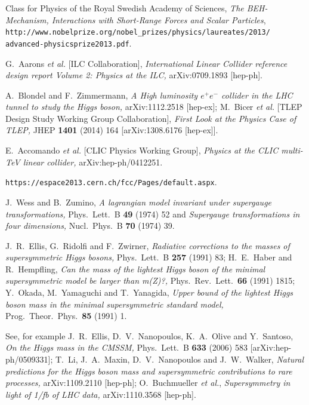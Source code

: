 \documentclass[12pt]{article}
\numberwithin{equation}{section}
\begin{document}
\begin{thebibliography}{99}
Class for Physics of the Royal Swedish Academy of Sciences,
{\it The BEH-Mechanism, Interactions with Short-Range Forces and Scalar Particles}, \\
{\tt http://www.nobelprize.org/nobel\_prizes/physics/laureates/2013/}\\ {\tt advanced-physicsprize2013.pdf}.

G.~Aarons {\it et al.}  [ILC Collaboration],
{\it International Linear Collider reference design report Volume 2: Physics at the ILC,}
  arXiv:0709.1893 [hep-ph].
  
A.~Blondel and F.~Zimmermann,
{\it A High luminosity $e^+e^-$ collider in the LHC tunnel to study the Higgs boson,}
  arXiv:1112.2518 [hep-ex];
M.~Bicer {\it et al.}  [TLEP Design Study Working Group Collaboration],
{\it First Look at the Physics Case of TLEP,}
  JHEP {\bf 1401} (2014) 164
  [arXiv:1308.6176 [hep-ex]].

E.~Accomando {\it et al.}  [CLIC Physics Working Group],
{\it Physics at the CLIC multi-TeV linear collider,}
  arXiv:hep-ph/0412251.

{\tt https://espace2013.cern.ch/fcc/Pages/default.aspx}.

J.~Wess and B.~Zumino,
{\it A lagrangian model invariant under supergauge transformations,}
  Phys.\ Lett.\  B {\bf 49} (1974) 52 and
{\it Supergauge transformations in four dimensions,}
  Nucl.\ Phys.\  B {\bf 70} (1974) 39.
  
J.~R.~Ellis, G.~Ridolfi and F.~Zwirner,
{\it Radiative corrections to the masses of supersymmetric Higgs bosons,}
  Phys.\ Lett.\  B {\bf 257} (1991) 83;
H.~E.~Haber and R.~Hempfling,
{\it Can the mass of the lightest Higgs boson of the minimal supersymmetric
  model be larger than m(Z)?,}
  Phys.\ Rev.\ Lett.\  {\bf 66} (1991) 1815;
Y.~Okada, M.~Yamaguchi and T.~Yanagida,
{\it Upper bound of the lightest Higgs boson mass in the minimal supersymmetric
  standard model,}
  Prog.\ Theor.\ Phys.\  {\bf 85} (1991) 1.
  
See, for example
J.~R.~Ellis, D.~V.~Nanopoulos, K.~A.~Olive and Y.~Santoso,
{\it On the Higgs mass in the CMSSM,}
  Phys.\ Lett.\  B {\bf 633} (2006) 583
  [arXiv:hep-ph/0509331];
T.~Li, J.~A.~Maxin, D.~V.~Nanopoulos and J.~W.~Walker,
{\it Natural predictions for the Higgs boson mass and supersymmetric contributions to rare processes,}
  arXiv:1109.2110 [hep-ph];
O.~Buchmueller {\it et al.},
{\it Supersymmetry in light of 1/fb of LHC data,}
  arXiv:1110.3568 [hep-ph].


\end{thebibliography}
\end{document}
